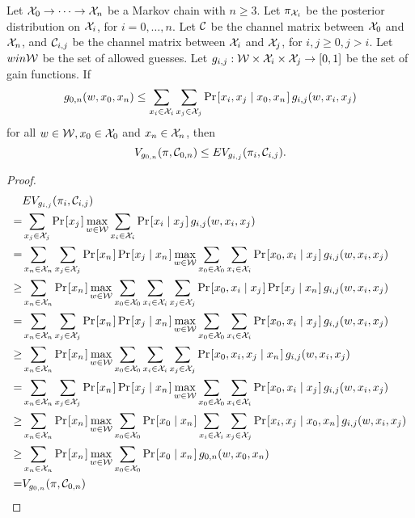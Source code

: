 \begin{theorem}
	Let $\mathcal{X}_0 \rightarrow \dots \rightarrow \mathcal{X}_n$ be a Markov chain with $n \geq 3$. Let $\pi_{\mathcal{X}_i}$ be the posterior distribution on $\mathcal{X}_i$, for $i = 0, \dots, n$. Let $\mathcal{C}$ be the channel matrix between $\mathcal{X}_0$ and $\mathcal{X}_n$, and $\mathcal{C}_{i,j}$ be the channel matrix between $\mathcal{X}_i$ and $\mathcal{X}_j$, for $i,j \geq 0, j > i$. Let $w in \mathcal{W}$ be the set of allowed guesses. Let $g_{i,j}: \mathcal{W} \times \mathcal{X}_i \times \mathcal{X}_j \rightarrow [0,1]$ be the set of gain functions. If
	\begin{equation}
		g_{0,n}(w,x_0,x_n) \leq \sum_{x_i \in \X_i} \sum_{x_j \in \X_j} \prob{x_i, x_j \mid x_0, x_n} g_{i,j}(w, x_i, x_j)
	\end{equation}
	for all $w \in \mathcal{W}, x_0 \in \mathcal{X}_0$ and $x_n \in \mathcal{X}_n$, then
	\begin{equation}
		V_{g_{0,n}}(\pi, \mathcal{C}_{0,n}) \leq EV_{g_{i,j}}(\pi_{i}, \mathcal{C}_{i,j}).
	\end{equation}
\end{theorem}


\begin{proof}
	\begin{align*}
	  & EV_{g_{i,j}}(\pi_{i}, \channel_{i,j}) \\
	= & \sum_{x_j \in \X_j} \prob{x_j} \max_{w \in \W} \sum_{x_i \in \X_i} \prob{x_i \mid x_j} g_{i,j}(w, x_i, x_j) \\
	= & \sum_{x_n \in \X_n} \sum_{x_j \in \X_j} \prob{x_n} \prob{x_j \mid x_n} \max_{w \in \W} \sum_{x_0 \in \X_0} \sum_{x_i \in \X_i} \prob{x_0, x_i \mid x_j} g_{i,j}(w, x_i, x_j) \\
	\geq & \sum_{x_n \in \X_n} \prob{x_n} \max_{w \in \W} \sum_{x_0 \in \X_0} \sum_{x_i \in \X_i} \sum_{x_j \in \X_j} \prob{x_0, x_i \mid x_j} \prob{x_j \mid x_n} g_{i,j}(w, x_i, x_j) \\
	= & \sum_{x_n \in \X_n} \sum_{x_j \in \X_j} \prob{x_n} \prob{x_j \mid x_n} \max_{w \in \W} \sum_{x_0 \in \X_0} \sum_{x_i \in \X_i} \prob{x_0, x_i \mid x_j} g_{i,j}(w, x_i, x_j) \\
	\geq & \sum_{x_n \in \X_n} \prob{x_n} \max_{w \in \W} \sum_{x_0 \in \X_0} \sum_{x_i \in \X_i} \sum_{x_j \in \X_j} \prob{x_0, x_i, x_j \mid x_n} g_{i,j}(w, x_i, x_j) \\
	= & \sum_{x_n \in \X_n} \sum_{x_j \in \X_j} \prob{x_n} \prob{x_j \mid x_n} \max_{w \in \W} \sum_{x_0 \in \X_0} \sum_{x_i \in \X_i} \prob{x_0, x_i \mid x_j} g_{i,j}(w, x_i, x_j) \\
	\geq & \sum_{x_n \in \X_n} \prob{x_n} \max_{w \in \W} \sum_{x_0 \in \X_0} \prob{x_0 \mid x_n} \sum_{x_i \in \X_i} \sum_{x_j \in \X_j} \prob{x_i, x_j \mid x_0, x_n} g_{i,j}(w, x_i, x_j) \\
	\geq & \sum_{x_n \in \X_n} \prob{x_n} \max_{w \in \W} \sum_{x_0 \in \X_0} \prob{x_0 \mid x_n} g_{0,n}(w,x_0,x_n) \\
	= & V_{g_{0,n}}(\pi, \channel_{0,n})
	\end{align*}
\end{proof}







